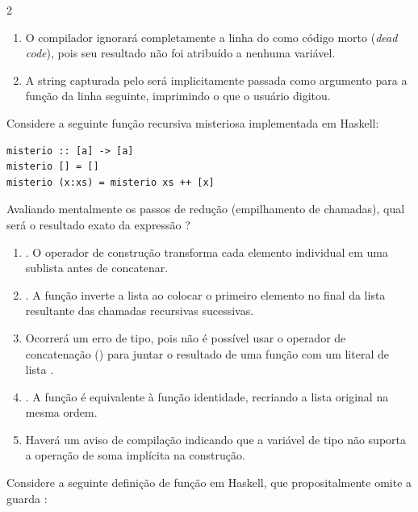 \documentclass[a4paper,10pt,brazil]{article}
\begin{document}
\begin{multicols}{2}
\begin{enumerate}
  \item O compilador ignorará completamente a linha do  como código morto (\emph{dead code}), pois seu resultado não foi atribuído a nenhuma variável.

  \item A string capturada pelo  será implicitamente passada como argumento para a função  da linha seguinte, imprimindo o que o usuário digitou.


\end{enumerate}

Considere a seguinte função recursiva misteriosa implementada em Haskell:

\begin{verbatim}
misterio :: [a] -> [a]
misterio [] = []
misterio (x:xs) = misterio xs ++ [x]
\end{verbatim}

Avaliando mentalmente os passos de redução (empilhamento de chamadas), qual será o resultado exato da expressão ?

\begin{enumerate}
  \item \haskellinline{[[1], [2], [3]]}. O operador de construção transforma cada elemento individual em uma sublista antes de concatenar.

  \item \haskellinline{[3, 2, 1]}. A função inverte a lista ao colocar o primeiro elemento no final da lista resultante das chamadas recursivas sucessivas.

  \item Ocorrerá um erro de tipo, pois não é possível usar o operador de concatenação (\haskellinline{++}) para juntar o resultado de uma função com um literal de lista \haskellinline{[x]}.

  \item \haskellinline{[1, 2, 3]}. A função é equivalente à função identidade, recriando a lista original na mesma ordem.

  \item Haverá um aviso de compilação indicando que a variável de tipo  não suporta a operação de soma implícita na construção.


\end{enumerate}

Considere a seguinte definição de função em Haskell, que propositalmente omite a guarda :


\end{multicols}
\end{document}

